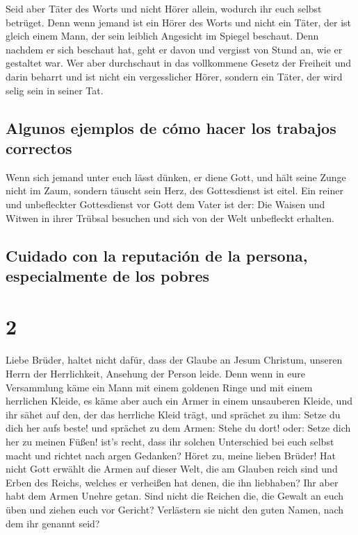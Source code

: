  Seid aber Täter des Worts und nicht Hörer allein,
wodurch ihr euch selbst betrüget.  Denn wenn jemand ist
ein Hörer des Worts und nicht ein Täter, der ist gleich einem Mann, der
sein leiblich Angesicht im Spiegel beschaut.  Denn
nachdem er sich beschaut hat, geht er davon und vergisst von Stund an,
wie er gestaltet war.  Wer aber durchschaut in das
vollkommene Gesetz der Freiheit und darin beharrt und ist nicht ein
vergesslicher Hörer, sondern ein Täter, der wird selig sein in seiner
Tat.

\hypertarget{algunos-ejemplos-de-cuxf3mo-hacer-los-trabajos-correctos}{%
\subsection{Algunos ejemplos de cómo hacer los trabajos
correctos}\label{algunos-ejemplos-de-cuxf3mo-hacer-los-trabajos-correctos}}

 Wenn sich jemand unter euch lässt dünken, er diene Gott,
und hält seine Zunge nicht im Zaum, sondern täuscht sein Herz, des
Gottesdienst ist eitel.  Ein reiner und unbefleckter
Gottesdienst vor Gott dem Vater ist der: Die Waisen und Witwen in ihrer
Trübsal besuchen und sich von der Welt unbefleckt erhalten.

\hypertarget{cuidado-con-la-reputaciuxf3n-de-la-persona-especialmente-de-los-pobres}{%
\subsection{Cuidado con la reputación de la persona, especialmente de
los
pobres}\label{cuidado-con-la-reputaciuxf3n-de-la-persona-especialmente-de-los-pobres}}

\hypertarget{section-1}{%
\section{2}\label{section-1}}

 Liebe Brüder, haltet nicht dafür, dass der Glaube an
Jesum Christum, unseren Herrn der Herrlichkeit, Ansehung der Person
leide.  Denn wenn in eure Versammlung käme ein Mann mit
einem goldenen Ringe und mit einem herrlichen Kleide, es käme aber auch
ein Armer in einem unsauberen Kleide,  und ihr sähet auf
den, der das herrliche Kleid trägt, und sprächet zu ihm: Setze du dich
her aufs beste! und sprächet zu dem Armen: Stehe du dort! oder: Setze
dich her zu meinen Füßen!  ist's recht, dass ihr solchen
Unterschied bei euch selbst macht und richtet nach argen Gedanken?
 Höret zu, meine lieben Brüder! Hat nicht Gott erwählt die
Armen auf dieser Welt, die am Glauben reich sind und Erben des Reichs,
welches er verheißen hat denen, die ihn liebhaben?  Ihr
aber habt dem Armen Unehre getan. Sind nicht die Reichen die, die Gewalt
an euch üben und ziehen euch vor Gericht?  Verlästern sie
nicht den guten Namen, nach dem ihr genannt seid?

